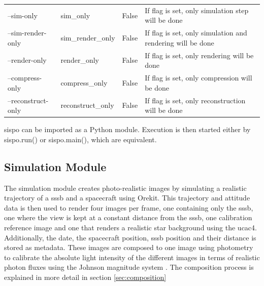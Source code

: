 \begin{table}[htpb]
\begin{tabular}{llll}
\multicolumn{1}{l|}{--sim-only}          & sim\_only              & False                      & If flag is set, only simulation step will be done                                                                         \\
\multicolumn{1}{l|}{--sim-render-only}   & sim\_render\_only      & False                      & If flag is set, only simulation and rendering will be done                                                                \\
\multicolumn{1}{l|}{--render-only}       & render\_only           & False                      & If flag is set, only rendering will be done                                                                               \\
\multicolumn{1}{l|}{--compress-only}     & compress\_only         & False                      & If flag is set, only compression will be done                                                                             \\
\multicolumn{1}{l|}{--reconstruct-only}  & reconstruct\_only      & False                      & If flag is set, only reconstruction will be done                                                                         

\end{tabular}
\label{tab:cli_args}
\end{table}

\gls{sispo} can be imported as a Python module. Execution is then started either by sispo.run() or sispo.main(), which are equivalent.

\subsection{Simulation Module}
The simulation module creates photo-realistic images by simulating a realistic trajectory of a \gls{sssb} and a spacecraft using Orekit. This trajectory and attitude data is then used to render four images per frame, one containing only the \gls{sssb}, one where the view is kept at a constant distance from the \gls{sssb}, one calibration reference image and one that renders a realistic star background using the \gls{ucac4}. Additionally, the date, the spacecraft position, \gls{sssb} position and their distance is stored as metadata. These images are composed to one image using photometry to calibrate the absolute light intensity of the different images in terms of realistic photon fluxes using the Johnson magnitude system \cite{bessel1979ubvri}. The composition process is explained in more detail in section \ref{sec:composition}

